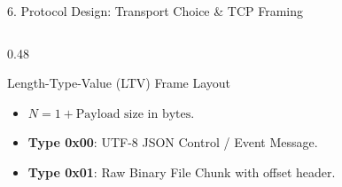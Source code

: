 \documentclass[t, aspectratio=169]{beamer}
\begin{document}
\begin{frame}{6. Protocol Design: Transport Choice \& TCP Framing}
\begin{columns}[T]
\begin{column}{0.48\textwidth}
\begin{block}{Length-Type-Value (LTV) Frame Layout}
\vspace{3pt}
\scriptsize
\begin{itemize}
    \setlength{\itemsep}{1.5pt}
    \item $N = 1 + \text{Payload size in bytes}$.
    \item \textbf{Type 0x00}: UTF-8 JSON Control / Event Message.
    \item \textbf{Type 0x01}: Raw Binary File Chunk with offset header.
\end{itemize}
\end{block}
\end{column}
\end{columns}
\end{frame}
\end{document}
